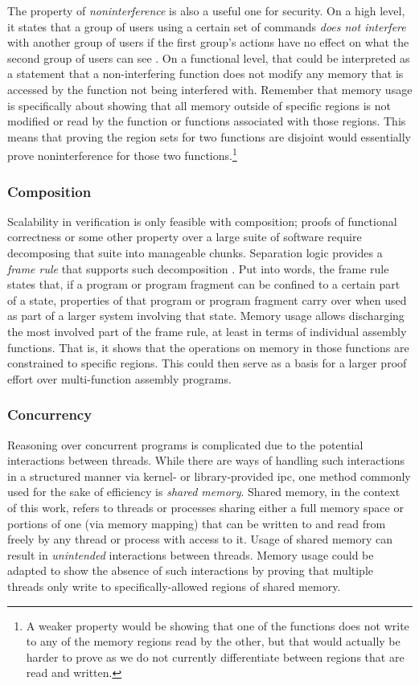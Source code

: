 The property of \emph{noninterference} is also a useful one for security.
On a high level, it states that a group of users using a certain set of commands \emph{does not interfere} with another group of users if the first group's actions have no effect on what the second group of users can see
\autocite{goguen1982security,rushby1992noninterference}.
On a functional level, that could be interpreted as a statement that a non-interfering function does not modify any memory that is accessed by the function not being interfered with.
Remember that memory usage is specifically about showing that all memory outside of specific regions is not modified or read by the function or functions associated with those regions.
This means that proving the region sets for two functions are disjoint would essentially prove noninterference for those two functions.\footnote{%
  A weaker property would be showing that one of the functions does not write
  to any of the memory regions read by the other, but that would actually be harder to prove as we do not currently differentiate between regions that are read and written.%
}

\subsubsection{Composition}\label{sse:composition}
Scalability in verification is only feasible with composition; proofs of functional correctness or some other property over a large suite of software require decomposing that suite into manageable chunks.
Separation logic provides a \emph{frame rule} that supports such%
decomposition \autocite{o2001local,reynolds2002separation,krebbers2017essence}.
Put into words, the frame rule states that,
if a program or program fragment can be confined to a certain part of a state, properties of that program or program fragment carry over when used as part of a larger system involving that state.
Memory usage allows discharging the most involved part of the frame rule, at least in terms of individual assembly functions.
That is, it shows that the operations on memory in those functions are constrained to specific regions.
This could then serve as a basis for a larger proof effort over multi-function assembly programs.

\subsubsection{Concurrency}
Reasoning over concurrent programs is complicated due to the potential interactions between threads.
While there are ways of handling such interactions in a structured manner via kernel- or library-provided \ac{ipc}, one method commonly used for the sake of efficiency is \emph{shared memory}.
Shared memory, in the context of this work, refers to threads or processes sharing either a full memory space or portions of one (via memory mapping) that can be written to and read from freely by any thread or process with access to it.
Usage of shared memory can result in \emph{unintended} interactions between threads.
Memory usage could be adapted to show the absence of such interactions by proving that multiple threads only write to specifically-allowed regions of shared memory.

